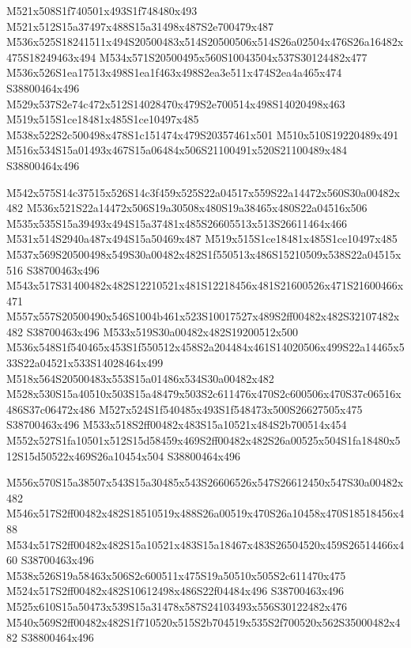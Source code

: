 \documentclass{article}
\begin{document}
\begin{multicols}{2}
M521x508S1f740501x493S1f748480x493 M521x512S15a37497x488S15a31498x487S2e700479x487 M536x525S18241511x494S20500483x514S20500506x514S26a02504x476S26a16482x475S18249463x494 M534x571S20500495x560S10043504x537S30124482x477 M536x526S1ea17513x498S1ea1f463x498S2ea3e511x474S2ea4a465x474 S38800464x496 M529x537S2e74c472x512S14028470x479S2e700514x498S14020498x463 M519x515S1ce18481x485S1ce10497x485 M538x522S2c500498x478S1c151474x479S20357461x501 M510x510S19220489x491 M516x534S15a01493x467S15a06484x506S21100491x520S21100489x484 S38800464x496

M542x575S14c37515x526S14c3f459x525S22a04517x559S22a14472x560S30a00482x482 M536x521S22a14472x506S19a30508x480S19a38465x480S22a04516x506 M535x535S15a39493x494S15a37481x485S26605513x513S26611464x466 M531x514S2940a487x494S15a50469x487 M519x515S1ce18481x485S1ce10497x485 M537x569S20500498x549S30a00482x482S1f550513x486S15210509x538S22a04515x516 S38700463x496 M543x517S31400482x482S12210521x481S12218456x481S21600526x471S21600466x471 M557x557S20500490x546S1004b461x523S10017527x489S2ff00482x482S32107482x482 S38700463x496 M533x519S30a00482x482S19200512x500 M536x548S1f540465x453S1f550512x458S2a204484x461S14020506x499S22a14465x533S22a04521x533S14028464x499 M518x564S20500483x553S15a01486x534S30a00482x482 M528x530S15a40510x503S15a48479x503S2c611476x470S2c600506x470S37c06516x486S37c06472x486 M527x524S1f540485x493S1f548473x500S26627505x475 S38700463x496 M533x518S2ff00482x483S15a10521x484S2b700514x454 M552x527S1fa10501x512S15d58459x469S2ff00482x482S26a00525x504S1fa18480x512S15d50522x469S26a10454x504 S38800464x496

M556x570S15a38507x543S15a30485x543S26606526x547S26612450x547S30a00482x482 M546x517S2ff00482x482S18510519x488S26a00519x470S26a10458x470S18518456x488 M534x517S2ff00482x482S15a10521x483S15a18467x483S26504520x459S26514466x460 S38700463x496 M538x526S19a58463x506S2c600511x475S19a50510x505S2c611470x475 M524x517S2ff00482x482S10612498x486S22f04484x496 S38700463x496 M525x610S15a50473x539S15a31478x587S24103493x556S30122482x476 M540x569S2ff00482x482S1f710520x515S2b704519x535S2f700520x562S35000482x482 S38800464x496


\end{multicols}
\end{document}

